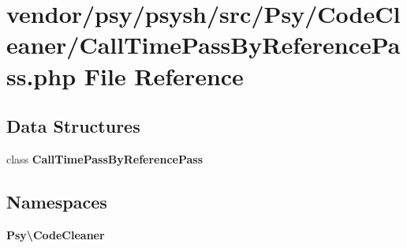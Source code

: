 \section{vendor/psy/psysh/src/\+Psy/\+Code\+Cleaner/\+Call\+Time\+Pass\+By\+Reference\+Pass.php File Reference}
\label{_call_time_pass_by_reference_pass_8php}
\subsection*{Data Structures}
\begin{DoxyCompactItemize}
\item 
class {\bf Call\+Time\+Pass\+By\+Reference\+Pass}
\end{DoxyCompactItemize}
\subsection*{Namespaces}
\begin{DoxyCompactItemize}
\item 
 {\bf Psy\textbackslash{}\+Code\+Cleaner}
\end{DoxyCompactItemize}
